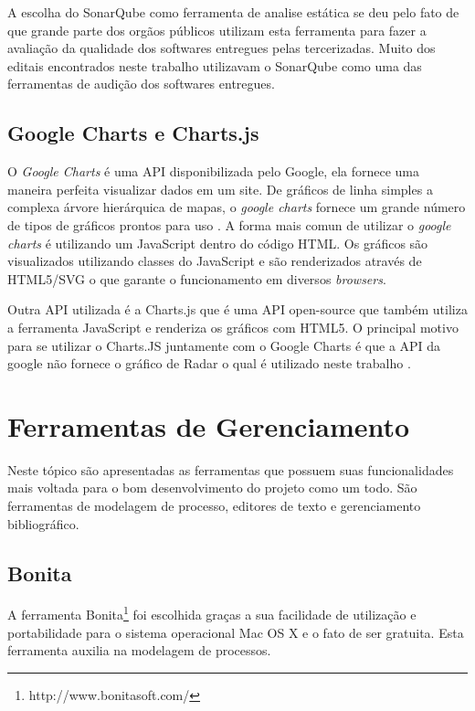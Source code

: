 A escolha do SonarQube como ferramenta de analise estática se deu pelo fato de que grande parte dos orgãos públicos utilizam esta ferramenta para fazer a avaliação da qualidade dos softwares entregues pelas tercerizadas. Muito dos editais encontrados neste trabalho utilizavam o SonarQube como uma das ferramentas de audição dos softwares entregues.

	
	\subsection{Google Charts e Charts.js}
	\label{sub:google_charts_chartsjs}
	O \textit{Google Charts} é uma API disponibilizada pelo Google, ela fornece uma maneira perfeita visualizar dados em um site. De gráficos de linha simples a complexa árvore hierárquica de mapas, o \textit{google charts} fornece um grande número de tipos de gráficos prontos para uso \cite{google_charts}. A forma mais comun de utilizar o \textit{google charts} é utilizando um JavaScript dentro do código HTML. Os gráficos são visualizados utilizando classes do JavaScript e são renderizados através de HTML5/SVG o que garante o funcionamento em diversos \textit{browsers}. 

Outra API utilizada é a Charts.js que é uma API open-source que também utiliza a ferramenta JavaScript e renderiza os gráficos com HTML5. O principal motivo para se utilizar o Charts.JS juntamente com o Google Charts é que a API da google não fornece o gráfico de Radar o qual é utilizado neste trabalho \cite{chartsjs}.
	
\section{Ferramentas de Gerenciamento}
Neste tópico são apresentadas as ferramentas que possuem suas funcionalidades mais voltada para o bom desenvolvimento do projeto como um todo. São ferramentas de modelagem de processo, editores de texto e gerenciamento bibliográfico. 

	\subsection{Bonita} %
	\label{sub:Bonita}
		 A ferramenta Bonita\footnote{http://www.bonitasoft.com/} foi escolhida graças a sua facilidade de utilização e portabilidade para o sistema operacional Mac OS X e o fato de ser gratuita. Esta ferramenta auxilia na modelagem de processos.

